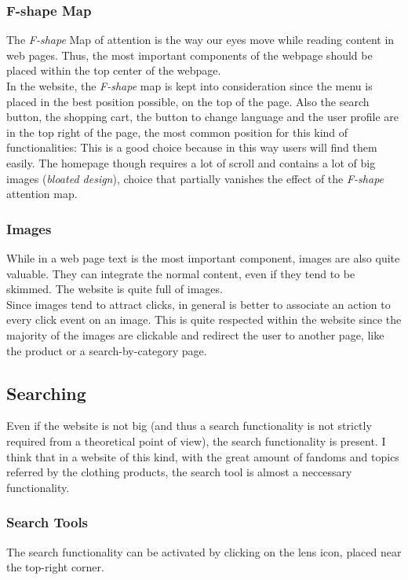 \subsubsection{F-shape Map}
The \textit{F-shape} Map of attention is the way our eyes move while reading content in web pages. Thus, the most important 
components of the webpage should be placed within the top center of the webpage. \\
In the website, the \textit{F-shape} map is kept into consideration since the menu is placed in the best 
position possible, on the top of the page. Also the search button, the shopping cart, the button to change language 
and the user profile are in the top right of the page, the most common position for this kind of functionalities: 
This is a good choice because in this way users will find them easily. 
The homepage though requires a lot of scroll and contains a lot of big images (\textit{bloated design}), choice that partially 
vanishes the effect of the \textit{F-shape} attention map.

\subsubsection{Images}
While in a web page text is the most important component, images are also quite valuable. 
They can integrate the normal content, even if they tend to be skimmed.
The website is quite full of images. \\
Since images tend to attract clicks, in general is better to associate an action to every click event on an image.
This is quite respected within the website since the majority of the images are clickable and redirect the user to another page, 
like the product or a search-by-category page.

\subsection{Searching}
Even if the website is not big (and thus a search functionality is not strictly required from a theoretical point of view),
the search functionality is present. I think that in a website of this kind, with the great amount of fandoms and topics referred by
the clothing products, the search tool is almost a neccessary functionality. 

\subsubsection{Search Tools}
The search functionality can be activated by clicking on the lens icon, placed near the top-right corner.


